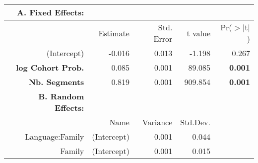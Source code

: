 \begin{tabular}{rrrrr}
 {\bf A. Fixed Effects:} \\
\hline
 & Estimate & Std. Error & t value & Pr($>$$|$t$|$) \\ 
  \hline
(Intercept) & -0.016 & 0.013 & -1.198 & 0.267 \\ 
  {\bf log Cohort Prob. } & 0.085 & 0.001 & 89.085 & {\bf 0.001} \\ 
  {\bf Nb. Segments }& 0.819 & 0.001 & 909.854 & {\bf 0.001} \\ 

\hline \hline
{\bf B. Random Effects:} \\
\hline
& Name & Variance & Std.Dev. \\
\hline
Language:Family & (Intercept) & 0.001 & 0.044 \\
Family & (Intercept) & 0.001 & 0.015 \\
\end{tabular}
